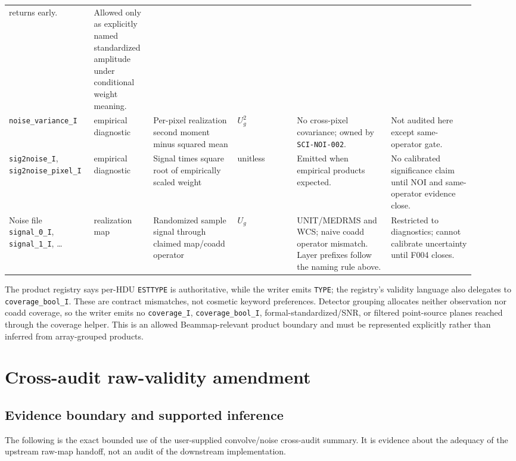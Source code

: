 \documentclass[11pt]{article}
\newcommand{\code}[1]{\nolinkurl{#1}}
\begin{document}
\begin{longtable}{L{0.14\linewidth}L{0.12\linewidth}L{0.17\linewidth}L{0.12\linewidth}L{0.19\linewidth}L{0.17\linewidth}}
returns early. & Allowed only as explicitly named standardized amplitude under
conditional weight meaning.\\
\code{noise_variance_I} & empirical diagnostic & Per-pixel realization second
moment minus squared mean & \(U_g^2\) & No cross-pixel covariance; owned by
\code{SCI-NOI-002}. & Not audited here except same-operator gate.\\
\code{sig2noise_I}, \code{sig2noise_pixel_I} & empirical diagnostic & Signal
times square root of empirically scaled weight & unitless & Emitted when
empirical products expected. & No calibrated significance claim until NOI and
same-operator evidence close.\\
Noise file \code{signal_0_I}, \code{signal_1_I}, \ldots & realization map &
Randomized sample signal through claimed map/coadd operator & \(U_g\) &
UNIT/MEDRMS and WCS; naive coadd operator mismatch.  Layer prefixes follow the
naming rule above. & Restricted to diagnostics; cannot calibrate uncertainty
until F004 closes.\\
\bottomrule
\end{longtable}

The product registry says per-HDU \code{ESTTYPE} is authoritative, while the
writer emits \code{TYPE}; the registry's validity language also delegates to
\code{coverage_bool_I}.  These are contract mismatches, not cosmetic keyword
preferences.  Detector grouping allocates neither observation nor coadd
coverage, so the writer emits no \code{coverage_I}, \code{coverage_bool_I},
formal-standardized/SNR, or filtered point-source planes reached through the
coverage helper.  This is an allowed Beammap-relevant product boundary and must
be represented explicitly rather than inferred from array-grouped products.

\section{Cross-audit raw-validity amendment}
\label{sec:cross-audit-validity}

\subsection{Evidence boundary and supported inference}

The following is the exact bounded use of the user-supplied convolve/noise
cross-audit summary.  It is evidence about the adequacy of the upstream raw-map
handoff, not an audit of the downstream implementation.
\end{document}
